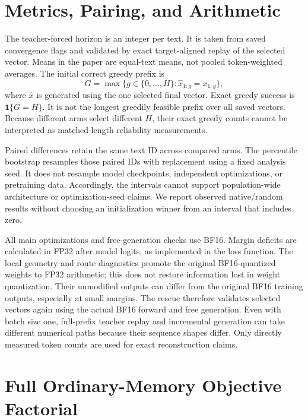 \section{Metrics, Pairing, and Arithmetic}
\label{app:metrics}

The teacher-forced horizon is an integer per text.
It is taken from saved convergence flags and validated by exact target-aligned replay of the selected vector.
Means in the paper are equal-text means, not pooled token-weighted averages.
The initial correct greedy prefix is
\begin{equation}
 G=\max\{g\in\{0,\ldots,H\}:\widehat x_{1:g}=x_{1:g}\},
\end{equation}
where $\widehat x$ is generated using the one selected final vector.
Exact greedy success is $\mathbf{1}\{G=H\}$.
It is not the longest greedily feasible prefix over all saved vectors.
Because different arms select different $H$, their exact greedy counts cannot be interpreted as matched-length reliability measurements.

Paired differences retain the same text ID across compared arms.
The percentile bootstrap resamples those paired IDs with replacement using a fixed analysis seed.
It does not resample model checkpoints, independent optimizations, or pretraining data.
Accordingly, the intervals cannot support population-wide architecture or optimization-seed claims.
We report observed native/random results without choosing an initialization winner from an interval that includes zero.

All main optimizations and free-generation checks use BF16.
Margin deficits are calculated in FP32 after model logits, as implemented in the loss function.
The local geometry and route diagnostics promote the original BF16-quantized weights to FP32 arithmetic; this does not restore information lost in weight quantization.
Their unmodified outputs can differ from the original BF16 training outputs, especially at small margins.
The rescue therefore validates selected vectors again using the actual BF16 forward and free generation.
Even with batch size one, full-prefix teacher replay and incremental generation can take different numerical paths because their sequence shapes differ.
Only directly measured token counts are used for exact reconstruction claims.

\section{Full Ordinary-Memory Objective Factorial}
\label{app:objectives}

